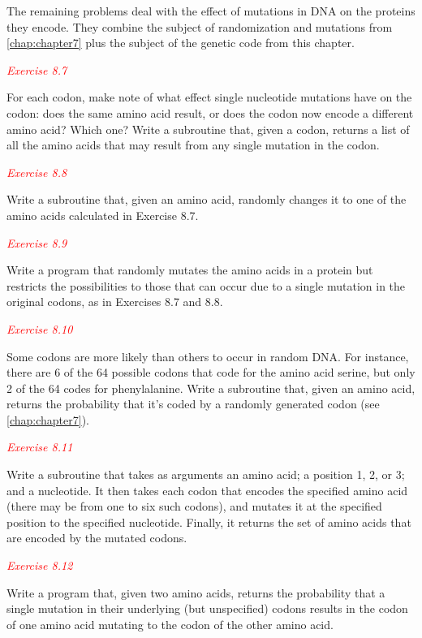 The remaining problems deal with the effect of mutations in DNA on the proteins they encode. They combine the subject of randomization and mutations from \autoref{chap:chapter7} plus the subject of the genetic code from this chapter. 

\textcolor{red}{\textit{Exercise 8.7}}
\begin{adjustwidth}{2em}{}
For each codon, make note of what effect single nucleotide mutations have on the codon: does the same amino acid result, or does the codon now encode a different amino acid? Which one? Write a subroutine that, given a codon, returns a list of all the amino acids that may result from any single mutation in the codon. 
\end{adjustwidth}

\textcolor{red}{\textit{Exercise 8.8}}
\begin{adjustwidth}{2em}{}
Write a subroutine that, given an amino acid, randomly changes it to one of the amino acids calculated in Exercise 8.7. 
\end{adjustwidth}

\textcolor{red}{\textit{Exercise 8.9}}
\begin{adjustwidth}{2em}{}
Write a program that randomly mutates the amino acids in a protein but restricts the possibilities to those that can occur due to a single mutation in the original codons, as in Exercises 8.7 and 8.8.
\end{adjustwidth}

\textcolor{red}{\textit{Exercise 8.10}}
\begin{adjustwidth}{2em}{}
Some codons are more likely than others to occur in random DNA. For instance, there are 6 of the 64 possible codons that code for the amino acid serine, but only 2 of the 64 codes for phenylalanine. Write a subroutine that, given an amino acid, returns the probability that it's coded by a randomly generated codon (see \autoref{chap:chapter7}). 
\end{adjustwidth}

\textcolor{red}{\textit{Exercise 8.11}}
\begin{adjustwidth}{2em}{}
Write a subroutine that takes as arguments an amino acid; a position 1, 2, or 3; and a nucleotide. It then takes each codon that encodes the specified amino acid (there may be from one to six such codons), and mutates it at the specified position to the specified nucleotide. Finally, it returns the set of amino acids that are encoded by the mutated codons. 
\end{adjustwidth}

\textcolor{red}{\textit{Exercise 8.12}}
\begin{adjustwidth}{2em}{}
Write a program that, given two amino acids, returns the probability that a single mutation in their underlying (but unspecified) codons results in the codon of one amino acid mutating to the codon of the other amino acid. 
\end{adjustwidth}

